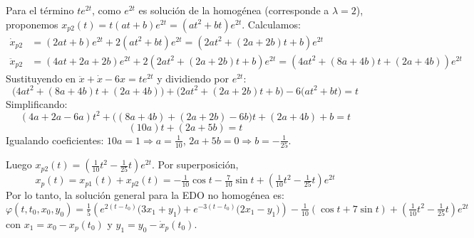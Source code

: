 \begin{sol}
\begin{enumerate}[leftmargin=*, label=(\alph*)]
Para el término $te^{2t}$, como $e^{2t}$ es solución de la homogénea (corresponde a $\lambda=2$), proponemos $x_{p2}(t) = t(at+b)e^{2t} = (at^2+bt)e^{2t}$. Calculamos:
\begin{align*}
\dot{x}_{p2} &= (2at + b)e^{2t} + 2(at^2 + bt)e^{2t} = (2at^2 + (2a+2b)t + b)e^{2t} \\
\ddot{x}_{p2} &= (4at + 2a + 2b)e^{2t} + 2(2at^2 + (2a+2b)t + b)e^{2t} = (4at^2 + (8a+4b)t + (2a+4b))e^{2t}
\end{align*}
Sustituyendo en $\ddot{x} + \dot{x} - 6x = te^{2t}$ y dividiendo por $e^{2t}$:
\[
\big(4at^2 + (8a+4b)t + (2a+4b)\big) + \big(2at^2 + (2a+2b)t + b\big) - 6\big(at^2+bt\big) = t
\]
Simplificando:
\[
(4a+2a-6a)t^2 + \big((8a+4b)+(2a+2b)-6b\big)t + (2a+4b)+b = t
\]
\[
(10a)t + (2a+5b) = t
\]
Igualando coeficientes: $10a = 1 \Rightarrow a = \tfrac{1}{10}$, $2a+5b = 0 \Rightarrow b = -\tfrac{1}{25}$.

Luego $x_{p2}(t) = (\tfrac{1}{10}t^2 - \tfrac{1}{25}t)e^{2t}$. Por superposición, 
\[
x_p(t) = x_{p1}(t) + x_{p2}(t) = -\tfrac{1}{10}\cos t - \tfrac{7}{10}\sin t + (\tfrac{1}{10}t^2 - \tfrac{1}{25}t)e^{2t}
\]
Por lo tanto, la solución general para la EDO no homogénea es:
\[
\varphi(t,t_0,x_0,y_0) = \tfrac15\left(e^{2(t-t_0)}\big(3x_1 + y_1\big) + e^{-3(t-t_0)}\big(2x_1 - y_1\big)\right) - \tfrac{1}{10}(\cos t + 7\sin t) + (\tfrac{1}{10}t^2 - \tfrac{1}{25}t)e^{2t}
\]
con $x_1 = x_0 - x_p(t_0)$ y $y_1 = y_0 - \dot{x}_p(t_0)$.
\end{enumerate}
\end{sol}

